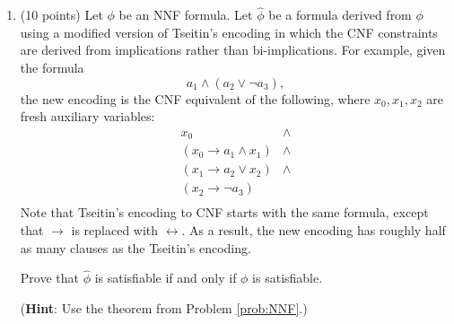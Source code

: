 \documentclass{article}
\newenvironment{solution}{\color{blue} \em }{}
\begin{document}
\begin{enumerate}
\begin{solution}
\begin{proof}
\end{proof}
\end{solution}



\item (10 points) Let $\phi$ be an NNF formula.  Let $\hat{\phi}$ be a formula derived from $\phi$ using a modified version of Tseitin's encoding in which the CNF constraints are derived from implications rather than bi-implications.   For example, given the formula
\[a_1\land (a_2 \lor \neg a_3),\]
the new encoding is the CNF equivalent of the following, where $x_0, x_1, x_2$ are fresh auxiliary variables:
\[
\begin{array}{ll}
x_0 & \land \\
(x_0 \rightarrow a_1 \land x_1) & \land \\
(x_1 \rightarrow a_2 \lor x_2) & \land \\
(x_2 \rightarrow \neg a_3) &  \\
\end{array}
\]
Note that Tseitin's encoding to CNF starts with the same formula, except that $\rightarrow$ is replaced with $\leftrightarrow$.  As a result, the new encoding has roughly half as many clauses as the Tseitin's encoding.

\medskip
Prove that $\hat{\phi}$ is satisfiable if and only if $\phi$ is satisfiable.

\medskip
(\textbf{Hint}: Use the theorem from Problem \ref{prob:NNF}.)


\end{enumerate}
\end{document}

